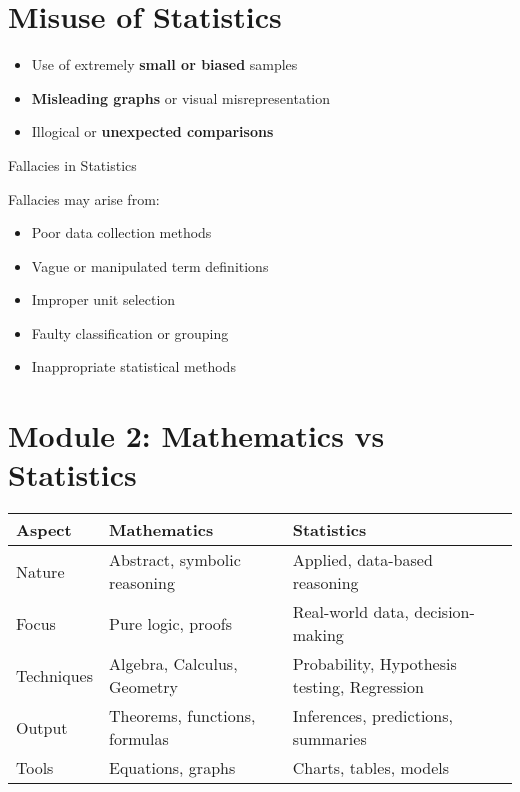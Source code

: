 \documentclass[
  letterpaper,
  DIV=11,
  numbers=noendperiod]{scrreprt}
\providecommand{\tightlist}{%
  \setlength{\itemsep}{0pt}\setlength{\parskip}{0pt}}
\begin{document}
\section{Misuse of Statistics}\label{misuse-of-statistics}

\begin{itemize}
\tightlist
\item
  Use of extremely \textbf{small or biased} samples
\item
  \textbf{Misleading graphs} or visual misrepresentation
\item
  Illogical or \textbf{unexpected comparisons}
\end{itemize}

Fallacies in Statistics

Fallacies may arise from:

\begin{itemize}
\tightlist
\item
  Poor data collection methods
\item
  Vague or manipulated term definitions
\item
  Improper unit selection
\item
  Faulty classification or grouping
\item
  Inappropriate statistical methods
\end{itemize}

\section{Module 2: Mathematics vs
Statistics}\label{module-2-mathematics-vs-statistics}

\begin{longtable}[]{@{}
  >{\raggedright\arraybackslash}p{}
  >{\raggedright\arraybackslash}p{}
  >{\raggedright\arraybackslash}p{}@{}}
\toprule\noalign{}
\begin{minipage}[b]{\linewidth}\raggedright
Aspect
\end{minipage} & \begin{minipage}[b]{\linewidth}\raggedright
Mathematics
\end{minipage} & \begin{minipage}[b]{\linewidth}\raggedright
Statistics
\end{minipage} \\
\midrule\noalign{}
\endhead
\bottomrule\noalign{}
\endlastfoot
Nature & Abstract, symbolic reasoning & Applied, data-based reasoning \\
Focus & Pure logic, proofs & Real-world data, decision-making \\
Techniques & Algebra, Calculus, Geometry & Probability, Hypothesis
testing, Regression \\
Output & Theorems, functions, formulas & Inferences, predictions,
summaries \\
Tools & Equations, graphs & Charts, tables, models \\
\end{longtable}
\end{document}
